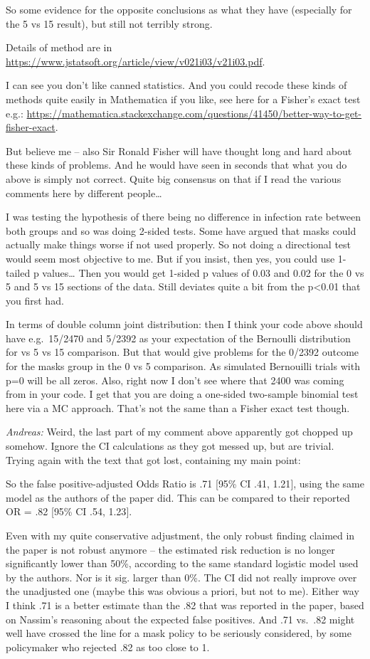 \documentclass[
]{book}
\begin{document}
So some evidence for the opposite conclusions as what they have (especially for the 5 vs 15 result), but still not terribly strong.

Details of method are in \url{https://www.jstatsoft.org/article/view/v021i03/v21i03.pdf}.

I can see you don't like canned statistics. And you could recode these kinds of methods quite easily in Mathematica if you like, see here for a Fisher's exact test e.g.:
\url{https://mathematica.stackexchange.com/questions/41450/better-way-to-get-fisher-exact}.

But believe me -- also Sir Ronald Fisher will have thought long and hard about these kinds of problems. And he would have seen in seconds that what you do above is simply not correct. Quite big consensus on that if I read the various comments here by different people\ldots{}

I was testing the hypothesis of there being no difference in infection rate between both groups and so was doing 2-sided tests. Some have argued that masks could actually make things worse if not used properly. So not doing a directional test would seem most objective to me. But if you insist, then yes, you could use 1-tailed p values\ldots{} Then you would get 1-sided p values of 0.03 and 0.02 for the 0 vs 5 and 5 vs 15 sections of the data. Still deviates quite a bit from the p\textless0.01 that you first had.

In terms of double column joint distribution: then I think your code above should have e.g.~15/2470 and 5/2392 as your expectation of the Bernoulli distribution for vs 5 vs 15 comparison. But that would give problems for the 0/2392 outcome for the masks group in the 0 vs 5 comparison. As simulated Bernouilli trials with p=0 will be all zeros. Also, right now I don't see where that 2400 was coming from in your code. I get that you are doing a one-sided two-sample binomial test here via a MC approach. That's not the same than a Fisher exact test though.

\emph{Andreas:}
Weird, the last part of my comment above apparently got chopped up somehow. Ignore the CI calculations as they got messed up, but are trivial. Trying again with the text that got lost, containing my main point:

So the false positive-adjusted Odds Ratio is .71 {[}95\% CI .41, 1.21{]}, using the same model as the authors of the paper did. This can be compared to their reported OR = .82 {[}95\% CI .54, 1.23{]}.

Even with my quite conservative adjustment, the only robust finding claimed in the paper is not robust anymore -- the estimated risk reduction is no longer significantly lower than 50\%, according to the same standard logistic model used by the authors. Nor is it sig. larger than 0\%. The CI did not really improve over the unadjusted one (maybe this was obvious a priori, but not to me). Either way I think .71 is a better estimate than the .82 that was reported in the paper, based on Nassim's reasoning about the expected false positives. And .71 vs.~.82 might well have crossed the line for a mask policy to be seriously considered, by some policymaker who rejected .82 as too close to 1.
\end{document}
